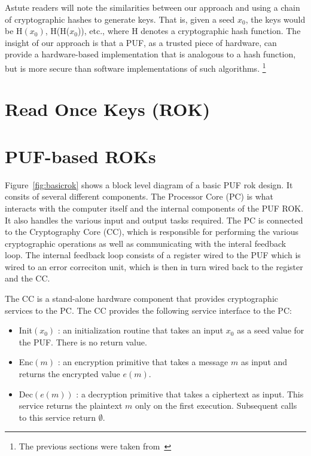 Astute readers will note the similarities between our approach and using a chain of cryptographic hashes to generate
keys.  That is, given a seed $x_0$, the keys would be {\sf H}$(x_0)$, {\sf H}({\sf H}($x_0$)), etc., where {\sf H}
denotes a cryptographic hash function.  The insight of our approach is that a PUF, as a trusted piece of hardware,
can provide a hardware-based implementation that is analogous to a hash function, but is more secure than
software implementations of such algorithms.
\footnote{The previous sections were taken from~\cite{PUFROK}}

\section{Read Once Keys (ROK)}

\section{PUF-based ROKs}
Figure~\ref{fig:basicrok} shows a block level diagram of a basic PUF rok design. It consits of several different
components. The Processor Core (PC) is what interacts with the computer itself and the internal components of the
PUF ROK. It also handles the various input and output tasks required.
 The PC is connected to the Cryptography Core (CC), which is responsible for performing the various
cryptographic operations as well as communicating with the interal feedback loop.
The internal feedback loop consists of a register wired to the PUF which is wired to an error correciton unit, which
is then in turn wired back to the register and the CC.

The CC is a stand-alone hardware component that provides cryptographic services to the PC.  The CC provides the 
following service interface to the PC:
\begin{itemize}
\item {\sf Init}$(x_0)$ : an initialization routine that takes an input $x_0$ as a seed value for the PUF.  There is no return value.
\item {\sf Enc}$(m)$ : an encryption primitive that takes a message $m$ as input and returns the encrypted value $e(m)$.
\item {\sf Dec}$(e(m))$ : a decryption primitive that takes a ciphertext as input.  This service returns the plaintext $m$ only
on the first execution.  Subsequent calls to this service return $\emptyset$.
\end{itemize}

